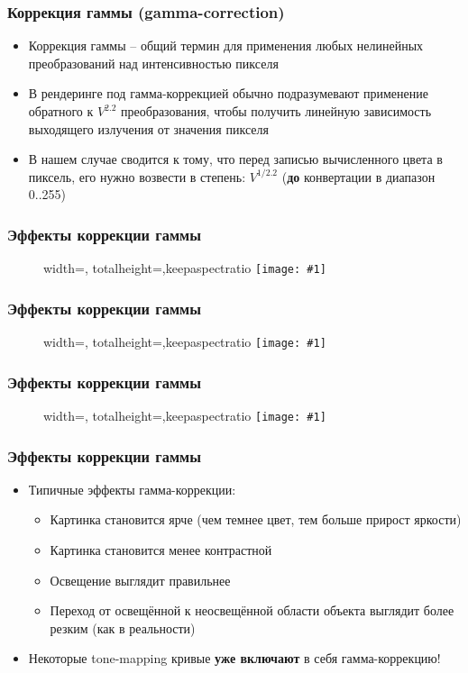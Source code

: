 \documentclass[10pt]{beamer}
\newcommand{\slideimage}[1]{
  \begin{figure}
    \begin{adjustbox}{width=\textwidth, totalheight=\textheight-2\baselineskip-2\baselineskip,keepaspectratio}
      \texttt{[image: \#1]}
    \end{adjustbox}
  \end{figure}
}
\begin{document}
\begin{frame}[fragile]
\frametitle{Коррекция гаммы (gamma-correction)}
\begin{itemize}
\item Коррекция гаммы -- общий термин для применения любых нелинейных преобразований над интенсивностью пикселя
\pause
\item В рендеринге под гамма-коррекцией обычно подразумевают применение обратного к \begin{math}V^{2.2}\end{math} преобразования, чтобы получить линейную зависимость выходящего излучения от значения пикселя
\pause
\item В нашем случае сводится к тому, что перед записью вычисленного цвета в пиксель, его нужно возвести в степень: \begin{math}V^{1/2.2}\end{math} (\textbf{до} конвертации в диапазон 0..255)
\end{itemize}
\end{frame}

\begin{frame}[fragile]
\frametitle{Эффекты коррекции гаммы}
\slideimage{gamma-ex1.png}
\end{frame}

\begin{frame}[fragile]
\frametitle{Эффекты коррекции гаммы}
\slideimage{gamma-ex2.png}
\end{frame}

\begin{frame}[fragile]
\frametitle{Эффекты коррекции гаммы}
\slideimage{gamma-ex3.png}
\end{frame}

\begin{frame}[fragile]
\frametitle{Эффекты коррекции гаммы}
\begin{itemize}
\item Типичные эффекты гамма-коррекции:
\pause
\begin{itemize}
\item Картинка становится ярче (чем темнее цвет, тем больше прирост яркости)
\pause
\item Картинка становится менее контрастной
\pause
\item Освещение выглядит правильнее
\pause
\item Переход от освещённой к неосвещённой области объекта выглядит более резким (как в реальности)
\end{itemize}
\pause
\item Некоторые tone-mapping кривые \textbf{уже включают} в себя гамма-коррекцию!
\end{itemize}
\end{frame}
\end{document}
